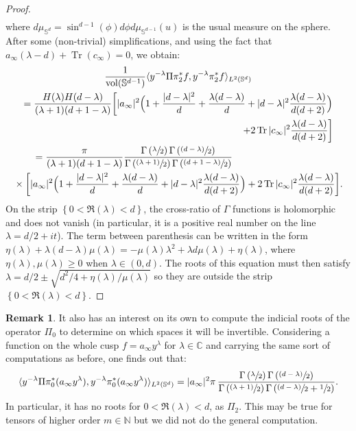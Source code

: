 \documentclass[10pt]{amsart}
\newcommand{\psfrac}[2]{\sfrac{(#1)}{#2}}
\newcommand{\C}{\mathbb{C}}
\newcommand{\N}{\mathbb{N}}
\newcommand{\Ss}{\mathbb{S}}
\DeclareMathOperator{\vol}{\mathrm{vol}}
\DeclareMathOperator{\Tr}{Tr}
\theoremstyle{plain}
\theoremstyle{definition}
\newtheorem{remark}{Remark}[section]
\begin{document}
\begin{proof}
\begin{multline*}
\end{multline*}
where $d\mu_{\Ss^d} = \sin^{d-1}(\phi) d\phi d\mu_{\Ss^{d-1}}(u)$ is the usual measure on the sphere. After some (non-trivial) simplifications, and using the fact that $a_\infty(\lambda-d)+\Tr(c_\infty) = 0$, we obtain:
\begin{multline*}
\frac{1}{\vol(\Ss^{d-1})}\langle y^{-\lambda} \Pi \pi_2^\ast f,y^{-\lambda}\pi_2^\ast f \rangle_{L^2(\Ss^d)} \\
= \dfrac{H(\lambda)H(d-\lambda)}{(\lambda+1)(d+1-\lambda)}\biggl[|a_\infty|^2\Bigl(1+\dfrac{|d-\lambda|^2}{d}+\dfrac{\lambda(d-\lambda)}{d}+|d-\lambda|^2\dfrac{\lambda(d-\lambda)}{d(d+2)}\Bigr)\\
\shoveright{+ 2\Tr |c_\infty|^2 \dfrac{\lambda(d-\lambda)}{d(d+2)} \biggr]} \\
\shoveleft{\hspace*{.5cm}= \dfrac{\pi}{(\lambda+1)(d+1-\lambda)} \dfrac{\Gamma\left(\sfrac{\lambda}{2}\right)\Gamma\left(\psfrac{d-\lambda}{2}\right)}{\Gamma\left(\psfrac{\lambda+1}{2}\right)\Gamma\left(\psfrac{d+1-\lambda}{2}\right)}} \\
{}\times \biggl[|a_\infty|^2\Bigl(1+\dfrac{|d-\lambda|^2}{d}+\dfrac{\lambda(d-\lambda)}{d}+|d-\lambda|^2\dfrac{\lambda(d-\lambda)}{d(d+2)}\Bigr) + 2\Tr |c_\infty|^2 \dfrac{\lambda(d-\lambda)}{d(d+2)} \biggr].
\end{multline*}
On the strip $\left\{0 < \Re(\lambda) < d\right\}$, the cross-ratio of $\Gamma$ functions is holomorphic and does not vanish (in particular, it is a positive real number on the line $\lambda=d/2+it$). The term between parenthesis can be written in the form $\eta(\lambda)+\lambda(d-\lambda)\mu(\lambda) = -\mu(\lambda)\lambda^2 + \lambda d \mu(\lambda) + \eta(\lambda)$, where $\eta(\lambda),\mu(\lambda) \geq 0$ when $\lambda \in (0,d)$. The roots of this equation must then satisfy $\lambda = d/2 \pm \sqrt{d^2/4+\eta(\lambda)/\mu(\lambda)}$ so they are outside the strip $\left\{0 < \Re(\lambda) < d\right\}$.
\end{proof}

\begin{remark}
\label{remark:pi0}
It also has an interest on its own to compute the indicial roots of the operator $\Pi_0$ to determine on which spaces it will be invertible. Considering a function on the whole cusp $f = a_\infty y^\lambda$ for $\lambda \in \C$ and carrying the same sort of computations as before, one finds out that:
\[
\langle y^{-\lambda} \Pi \pi_0^*(a_\infty y^\lambda),y^{-\lambda} \pi_0^*(a_\infty y^\lambda)\rangle_{L^2(\Ss^d)} = |a_\infty|^2 \pi\, \dfrac{\Gamma\left(\sfrac{\lambda}{2}\right)\Gamma\left(\psfrac{d-\lambda}{2}\right)}{\Gamma\left(\psfrac{\lambda+1}{2}\right)\Gamma\left(\psfrac{d-\lambda}{2}+\sfrac{1}{2}\right)}.
\]
In particular, it has no roots for $0 < \Re(\lambda) < d$, as $\Pi_2$. This may be true for tensors of higher order $m \in \N$ but we did not do the general computation.
\end{remark}
\end{document}

